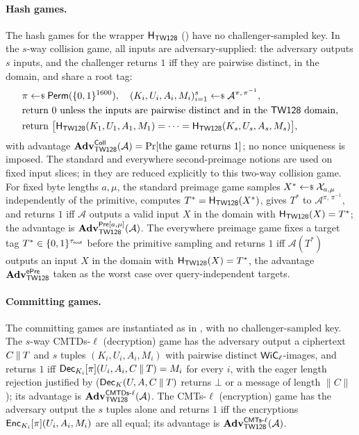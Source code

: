 \paragraph{Hash games.}
The hash games for the wrapper $\mathsf{H}_{\mathsf{TW128}}$ () have no
challenger-sampled key. In the $s$-way collision game, all inputs are
adversary-supplied: the adversary outputs $s$ inputs, and the challenger
returns $1$ iff they are pairwise distinct, in the \TW{} domain, and share
a root tag:
\begin{align*}
  &\pi \sample \Perm(\bits^{1600}), \quad
   (K_i, U_i, A_i, M_i)_{i=1}^s \sample \mathcal{A}^{\pi,\, \pi^{-1}}, \\
  &\text{return $0$ unless the inputs are pairwise distinct and in the \TW{} domain}, \\
  &\text{return } \bigl[\HTW(K_1, U_1, A_1, M_1) = \cdots =
     \HTW(K_s, U_s, A_s, M_s)\bigr],
\end{align*}
with advantage $\mathbf{Adv}^{\mathsf{Coll}}_{\textsf{TW128}}(\mathcal{A}) = \Pr[\text{the game returns }
1]$; no nonce uniqueness is imposed. The \cite{RS04} standard and
everywhere second-preimage notions are used on fixed input slices; in
 they are reduced explicitly to this
two-way collision game.
For fixed byte lengths $a,\mu$, the standard preimage game samples
$X^* \sample \mathcal{X}_{a,\mu}$ independently of the primitive, computes
$T^* = \mathsf{H}_{\mathsf{TW128}}(X^*)$, gives $T^*$ to
$\mathcal{A}^{\pi,\, \pi^{-1}}$, and returns $1$ iff $\mathcal{A}$ outputs a
valid input $X$ in the \TW{} domain with $\mathsf{H}_{\mathsf{TW128}}(X) = T^*$; the advantage is
$\mathbf{Adv}^{\mathsf{Pre}[a,\mu]}_{\textsf{TW128}}(\mathcal{A})$. The
everywhere preimage game fixes a target tag
$T^* \in \{0,1\}^{\tau_{\mathsf{root}}}$ before the primitive sampling and returns $1$
iff $\mathcal{A}(T^*)$ outputs an input $X$ in the domain with
$\mathsf{H}_{\mathsf{TW128}}(X) = T^*$, the advantage $\mathbf{Adv}^{\mathsf{ePre}}_{\textsf{TW128}}$ taken as the worst case over
query-independent targets.

\paragraph{Committing games.}
The \cite{BH22} committing games are instantiated as in
, with no challenger-sampled key. The $s$-way
CMTDs-$\ell$ (decryption) game has the adversary output a ciphertext
$C \mathbin{\|} T$ and $s$ tuples $(K_i, U_i, A_i, M_i)$ with pairwise distinct
$\mathsf{WiC}_\ell$-images, and returns $1$ iff
$\mathsf{Dec}_{K_i}[\pi](U_i, A_i, C \mathbin{\|} T) = M_i$ for every $i$, with the eager
length rejection justified by 
($\mathsf{Dec}_K(U, A, C \mathbin{\|} T)$ returns $\bot$ or a message of length $\|C\|$);
its advantage is
$\mathbf{Adv}^{\mathsf{CMTDs}\text{-}\ell}_{\textsf{TW128}}(\mathcal{A})$. The CMTs-$\ell$ (encryption) game has
the adversary output the $s$ tuples alone and returns $1$ iff the
encryptions $\mathsf{Enc}_{K_i}[\pi](U_i, A_i, M_i)$ are all equal; its advantage is
$\mathbf{Adv}^{\mathsf{CMTs}\text{-}\ell}_{\textsf{TW128}}(\mathcal{A})$.

